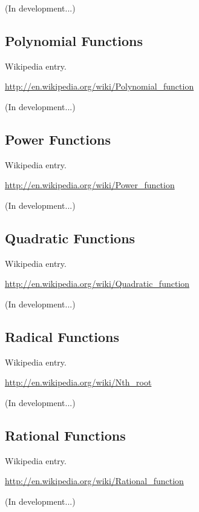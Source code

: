 \documentclass[12pt,twoside]{book}
\begin{document}
(In development...)

\subsection[Polynomial Functions]{Polynomial Functions}

Wikipedia entry.

\href{http://en.wikipedia.org/wiki/Polynomial_function}{http://en.wikipedia.org/wiki/Polynomial\_function}

(In development...)

\subsection[Power Functions]{Power Functions}

Wikipedia entry.

\href{http://en.wikipedia.org/wiki/Power_function}{http://en.wikipedia.org/wiki/Power\_function}

(In development...)

\subsection[Quadratic Functions]{Quadratic Functions}

Wikipedia entry.

\href{http://en.wikipedia.org/wiki/Quadratic_function}{http://en.wikipedia.org/wiki/Quadratic\_function}

(In development...)

\subsection[Radical Functions]{Radical Functions}

Wikipedia entry.

\href{http://en.wikipedia.org/wiki/Nth_root}{http://en.wikipedia.org/wiki/Nth\_root}

(In development...)

\subsection[Rational Functions]{Rational Functions}

Wikipedia entry.

\href{http://en.wikipedia.org/wiki/Rational_function}{http://en.wikipedia.org/wiki/Rational\_function}

(In development...)
\end{document}
